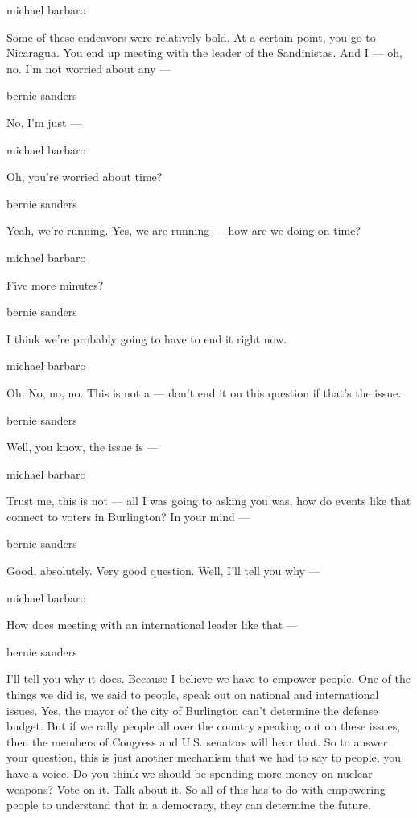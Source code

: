 michael barbaro

Some of these endeavors were relatively bold. At a certain point, you go
to Nicaragua. You end up meeting with the leader of the Sandinistas. And
I --- oh, no. I'm not worried about any ---

bernie sanders

No, I'm just ---

michael barbaro

Oh, you're worried about time?

bernie sanders

Yeah, we're running. Yes, we are running --- how are we doing on time?

michael barbaro

Five more minutes?

bernie sanders

I think we're probably going to have to end it right now.

michael barbaro

Oh. No, no, no. This is not a --- don't end it on this question if
that's the issue.

bernie sanders

Well, you know, the issue is ---

michael barbaro

Trust me, this is not --- all I was going to asking you was, how do
events like that connect to voters in Burlington? In your mind ---

bernie sanders

Good, absolutely. Very good question. Well, I'll tell you why ---

michael barbaro

How does meeting with an international leader like that ---

bernie sanders

I'll tell you why it does. Because I believe we have to empower people.
One of the things we did is, we said to people, speak out on national
and international issues. Yes, the mayor of the city of Burlington can't
determine the defense budget. But if we rally people all over the
country speaking out on these issues, then the members of Congress and
U.S. senators will hear that. So to answer your question, this is just
another mechanism that we had to say to people, you have a voice. Do you
think we should be spending more money on nuclear weapons? Vote on it.
Talk about it. So all of this has to do with empowering people to
understand that in a democracy, they can determine the future.


